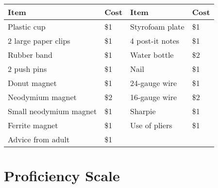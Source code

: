 \documentclass[14pt, fleqn, paper=letter, oneside]{scrartcl}
\begin{document}
\begin{table}[h]
\centering
\begin{tabular}{|l|l|l|l|}
\hline
\textbf{Item}          & \textbf{Cost} & \textbf{Item}   & \textbf{Cost} \\ \hline
Plastic cup            & \$1           & Styrofoam plate & \$1           \\ \hline
2 large paper clips    & \$1           & 4 post-it notes & \$1           \\ \hline
Rubber band            & \$1           & Water bottle    & \$2           \\ \hline
2 push pins            & \$1           & Nail            & \$1           \\ \hline
Donut magnet           & \$1           & 24-gauge wire   & \$1           \\ \hline
Neodymium magnet       & \$2           & 16-gauge wire   & \$2           \\ \hline
Small neodymium magnet & \$1           & Sharpie         & \$1           \\ \hline
Ferrite magnet         & \$1           & Use of pliers   & \$1           \\ \hline
Advice from adult      & \$1           &                 &               \\ \hline
\end{tabular}
\end{table}

\clearpage
\section{Proficiency Scale}
\end{document}

